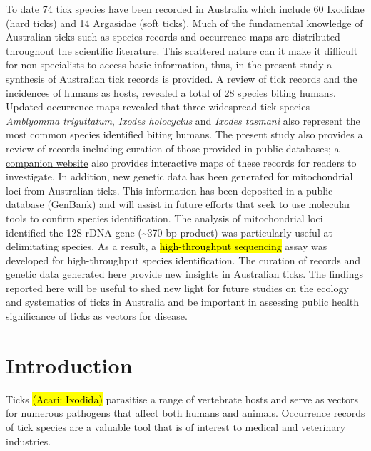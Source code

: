 \documentclass[a4paper, nobind]{templates/ociamthesis}
\begin{document}
To date 74 tick species have been recorded in Australia which include 60 Ixodidae (hard ticks) and 14 Argasidae (soft ticks).
Much of the fundamental knowledge of Australian ticks such as species records and occurrence maps are distributed throughout the scientific literature.
This scattered nature can it make it difficult for non-specialists to access basic information, thus, in the present study a synthesis of Australian tick records is provided.
A review of tick records and the incidences of humans as hosts, revealed a total of 28 species biting humans.
Updated occurrence maps revealed that three widespread tick species \emph{Amblyomma triguttatum}, \emph{Ixodes holocyclus} and \emph{Ixodes tasmani} also represent the most common species identified biting humans.
The present study also provides a review of records including curation of those provided in public databases; a \href{https://siobhonlegan.com/wildlife-ticks/}{companion website} also provides interactive maps of these records for readers to investigate.
In addition, new genetic data has been generated for mitochondrial loci from Australian ticks.
This information has been deposited in a public database (GenBank) and will assist in future efforts that seek to use molecular tools to confirm species identification.
The analysis of mitochondrial loci identified the 12S rDNA gene (\textasciitilde370 bp product) was particularly useful at delimitating species.
As a result, a \hl{high-throughput sequencing} assay was developed for high-throughput species identification.
The curation of records and genetic data generated here provide new insights in Australian ticks.
The findings reported here will be useful to shed new light for future studies on the ecology and systematics of ticks in Australia and be important in assessing public health significance of ticks as vectors for disease.

\hypertarget{introduction}{%
\section{Introduction}\label{introduction}}

Ticks \hl{(Acari: Ixodida)} parasitise a range of vertebrate hosts and serve as vectors for numerous pathogens that affect both humans and animals.
Occurrence records of tick species are a valuable tool that is of interest to medical and veterinary industries.
\end{document}
